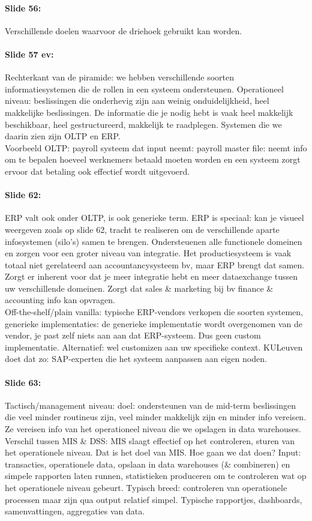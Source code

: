 \documentclass[10pt,a4paper]{report}
\begin{document}
\paragraph{Slide 56:}Verschillende doelen waarvoor de driehoek gebruikt kan worden.

\paragraph{Slide 57 ev:}Rechterkant van de piramide: we hebben verschillende soorten informatiesystemen die de rollen in een systeem ondersteunen. Operationeel niveau: beslissingen die onderhevig zijn aan weinig onduidelijkheid, heel makkelijke beslissingen. De informatie die je nodig hebt is vaak heel makkelijk beschikbaar, heel gestructureerd, makkelijk te raadplegen. Systemen die we daarin zien zijn OLTP en ERP.\\
Voorbeeld OLTP: payroll systeem dat input neemt: payroll master file: neemt info om te bepalen hoeveel werknemers betaald moeten worden en een systeem zorgt ervoor dat betaling ook effectief wordt uitgevoerd.
 
\paragraph{Slide 62:}ERP valt ook onder OLTP, is ook generieke term. ERP is speciaal: kan je visueel weergeven zoals op slide 62, tracht te realiseren om de verschillende aparte infosystemen (silo's) samen te brengen. Ondersteuenen alle functionele domeinen en zorgen voor een groter niveau van integratie. Het productiesysteem is vaak totaal niet gerelateerd aan accountancysysteem bv, maar ERP brengt dat samen. Zorgt er inherent voor dat je meer integratie hebt en meer dataexchange tussen uw verschillende domeinen. Zorgt dat sales \& marketing bij bv finance \& accounting info kan opvragen.\\
Off-the-shelf/plain vanilla: typische ERP-vendors verkopen die soorten systemen, generieke implementaties: de generieke implementatie wordt overgenomen van de vendor, je past zelf niets aan aan dat ERP-systeem. Dus geen custom implementatie.
Alternatief: wel customizen aan uw specifieke context. KULeuven doet dat zo: SAP-experten die het systeem aanpassen aan eigen noden.

\paragraph{Slide 63:}Tactisch/management niveau: doel: ondersteunen van de mid-term beslissingen die veel minder routineus zijn, veel minder makkelijk zijn en minder info vereisen. Ze vereisen info van het operationeel niveau die we opslagen in data warehouses.\\
Verschil tussen MIS \& DSS: MIS slaagt effectief op het controleren, sturen van het operationele niveau. Dat is het doel van MIS. Hoe gaan we dat doen? Input: transacties, operationele data, opslaan in data warehouses (\& combineren) en simpele rapporten laten runnen, statistieken produceren om te controleren wat op het operationele niveau gebeurt. Typisch breed: controleren van operationele processen maar zijn qua output relatief simpel. Typische rapportjes, dashboards, samenvattingen, aggregaties van data. 
\end{document}
